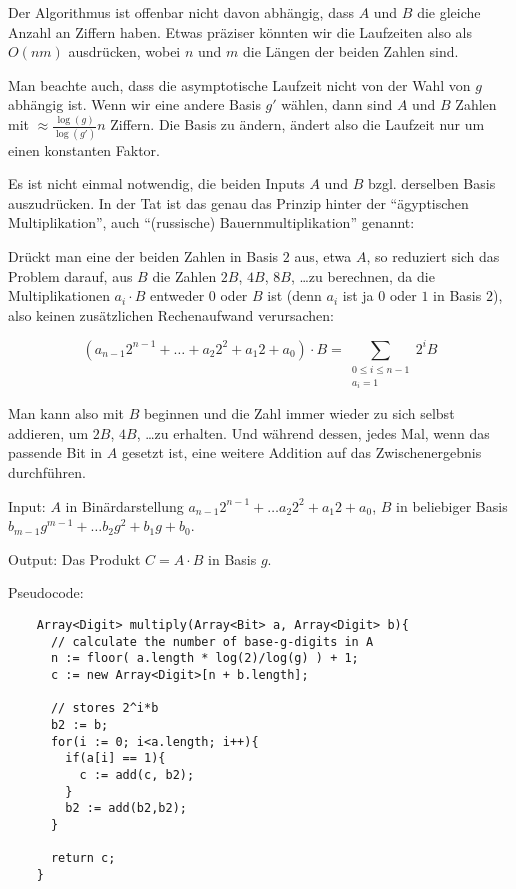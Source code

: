 \begin{remark}
    Der Algorithmus ist offenbar nicht davon abhängig, dass $A$ und $B$ die gleiche Anzahl an Ziffern haben. Etwas präziser könnten wir die Laufzeiten also als $O(nm)$ ausdrücken, wobei $n$ und $m$ die Längen der beiden Zahlen sind.
\end{remark}

\begin{remark}
    Man beachte auch, dass die asymptotische Laufzeit nicht von der Wahl von $g$ abhängig ist. Wenn wir eine andere Basis $g'$ wählen, dann sind $A$ und $B$ Zahlen mit $\approx \frac{\log(g)}{\log(g')}n$ Ziffern. Die Basis zu ändern, ändert also die Laufzeit nur um einen konstanten Faktor.
\end{remark}


\begin{remark}
    Es ist nicht einmal notwendig, die beiden Inputs $A$ und $B$ bzgl. derselben Basis auszudrücken. In der Tat ist das genau das Prinzip hinter der \enquote{ägyptischen Multiplikation}, auch \enquote{(russische) Bauernmultiplikation} genannt:

    Drückt man eine der beiden Zahlen in Basis $2$ aus, etwa $A$, so reduziert sich das Problem darauf, aus $B$ die Zahlen $2B$, $4B$, $8B$, \ldots zu berechnen, da die Multiplikationen $a_i\cdot B$ entweder $0$ oder $B$ ist (denn $a_i$ ist ja $0$ oder $1$ in Basis $2$), also keinen zusätzlichen Rechenaufwand verursachen:

    \[(a_{n-1} 2^{n-1} + \ldots + a_2 2^2 + a_1 2 + a_0) \cdot B = \sum_{\substack{0\leq i\leq n-1 \\ a_i = 1}} 2^i B\]

    Man kann also mit $B$ beginnen und die Zahl immer wieder zu sich selbst addieren, um $2B$, $4B$, \ldots zu erhalten. Und während dessen, jedes Mal, wenn das passende Bit in $A$ gesetzt ist, eine weitere Addition auf das Zwischenergebnis durchführen.
\end{remark}

\begin{algorithm}
    \label{alg:double-and-add}
    Input: $A$ in Binärdarstellung $a_{n-1}2^{n-1}+\ldots a_{2}2^2 +a_1 2 + a_0$, $B$ in beliebiger Basis $b_{m-1} g^{m-1} + \ldots b_2 g^2 + b_1 g+b_0$.

    Output: Das Produkt $C=A\cdot B$ in Basis $g$.

    Pseudocode:
    \begin{lstlisting}
    Array<Digit> multiply(Array<Bit> a, Array<Digit> b){
      // calculate the number of base-g-digits in A
      n := floor( a.length * log(2)/log(g) ) + 1;
      c := new Array<Digit>[n + b.length];

      // stores 2^i*b
      b2 := b;
      for(i := 0; i<a.length; i++){
        if(a[i] == 1){
          c := add(c, b2);
        }
        b2 := add(b2,b2);
      }

      return c;
    }
    \end{lstlisting}
\end{algorithm}

